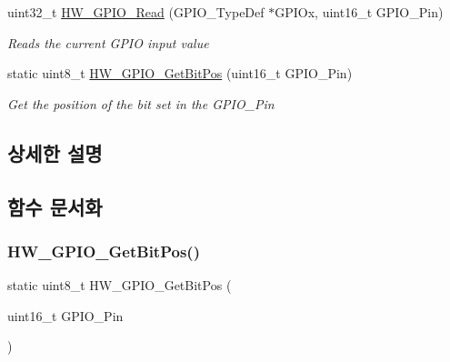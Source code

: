 \begin{DoxyCompactItemize}
uint32\+\_\+t \mbox{\hyperlink{group___lory_s_d_k___g_p_i_o___functions_ga56b12661dd88a5efa2ea9ee2aed4f82f}{H\+W\+\_\+\+G\+P\+I\+O\+\_\+\+Read}} (G\+P\+I\+O\+\_\+\+Type\+Def $\ast$G\+P\+I\+Ox, uint16\+\_\+t G\+P\+I\+O\+\_\+\+Pin)
\begin{DoxyCompactList}\small\item\em Reads the current G\+P\+IO input value \end{DoxyCompactList}\item 
static uint8\+\_\+t \mbox{\hyperlink{group___lory_s_d_k___g_p_i_o___functions_ga047b5023e2411e910f43fe0ae7df38a7}{H\+W\+\_\+\+G\+P\+I\+O\+\_\+\+Get\+Bit\+Pos}} (uint16\+\_\+t G\+P\+I\+O\+\_\+\+Pin)
\begin{DoxyCompactList}\small\item\em Get the position of the bit set in the G\+P\+I\+O\+\_\+\+Pin \end{DoxyCompactList}\end{DoxyCompactItemize}


\subsection{상세한 설명}


\subsection{함수 문서화}
\mbox{\label{group___lory_s_d_k___g_p_i_o___functions_ga047b5023e2411e910f43fe0ae7df38a7}} 
\subsubsection{\texorpdfstring{H\+W\+\_\+\+G\+P\+I\+O\+\_\+\+Get\+Bit\+Pos()}{HW\_GPIO\_GetBitPos()}}
{\footnotesize\ttfamily static uint8\+\_\+t H\+W\+\_\+\+G\+P\+I\+O\+\_\+\+Get\+Bit\+Pos (\begin{DoxyParamCaption}\item[{uint16\+\_\+t}]{G\+P\+I\+O\+\_\+\+Pin }\end{DoxyParamCaption})\hspace{0.3cm}{\ttfamily [static]}}



